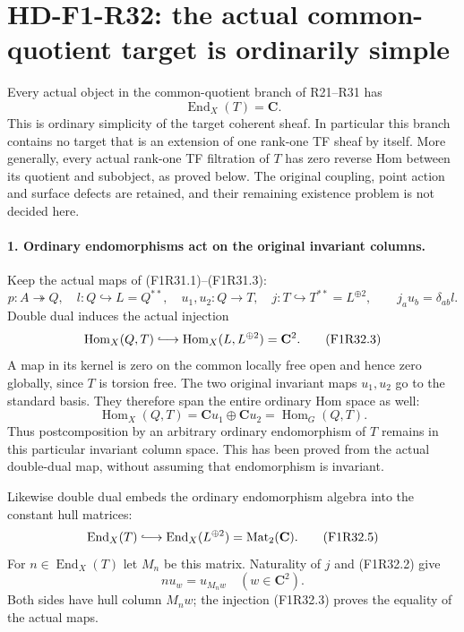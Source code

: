 \section[HD-F1-R32: the quotient target is simple]{HD-F1-R32: the actual common-quotient target is ordinarily simple}
\label{sec:followup-rm-common-quotient-simple-target}

Every actual object in the common-quotient branch
of R21--R31 has
\[
                         \operatorname{End}_X(T)=\mathbf C.
 \tag{F1R32.1}
\]
This is ordinary simplicity of the target
coherent sheaf. In particular this branch
contains no target that is an extension of
one rank-one TF sheaf by itself. More
generally, every actual rank-one TF
filtration of $T$ has zero reverse Hom
between its quotient and subobject, as
proved below. The original coupling,
point action and surface defects are
retained, and their remaining existence
problem is not decided here.

\paragraph{1. Ordinary endomorphisms act on the original invariant columns.}
Keep the actual maps of (F1R31.1)--(F1R31.3):
\[
 p:A\twoheadrightarrow Q,\quad l:Q\hookrightarrow L=Q^{**},
 \quad u_1,u_2:Q\to T,\quad
 j:T\hookrightarrow T^{**}=L^{\oplus2},
 \qquad j_a u_b=\delta_{ab}l.
 \tag{F1R32.2}
\]
Double dual induces the actual injection
\[
 \operatorname{Hom}_X(Q,T)
       \lhook\joinrel\longrightarrow
       \operatorname{Hom}_X(L,L^{\oplus2})=\mathbf C^2.
 \tag{F1R32.3}
\]
A map in its kernel is zero on the
common locally free open and hence
zero globally, since $T$ is torsion
free. The two original invariant maps
$u_1,u_2$ go to the standard basis.
They therefore span the entire
ordinary Hom space as well:
\[
        \operatorname{Hom}_X(Q,T)
             =\mathbf C u_1\oplus\mathbf C u_2
             =\operatorname{Hom}_G(Q,T).
 \tag{F1R32.4}
\]
Thus postcomposition by an arbitrary
ordinary endomorphism of $T$ remains
in this particular invariant column
space. This has been proved from the
actual double-dual map, without
assuming that endomorphism is invariant.

Likewise double dual embeds the
ordinary endomorphism algebra into
the constant hull matrices:
\[
 \operatorname{End}_X(T)\lhook\joinrel\longrightarrow
                  \operatorname{End}_X(L^{\oplus2})
                        =\operatorname{Mat}_2(\mathbf C).
 \tag{F1R32.5}
\]
For $n\in\operatorname{End}_X(T)$
let $M_n$ be this matrix. Naturality
of $j$ and (F1R32.2) give
\[
                         n u_w=u_{M_nw}
                             \quad(w\in\mathbf C^2).
 \tag{F1R32.6}
\]
Both sides have hull column $M_nw$;
the injection (F1R32.3) proves the
equality of the actual maps.

